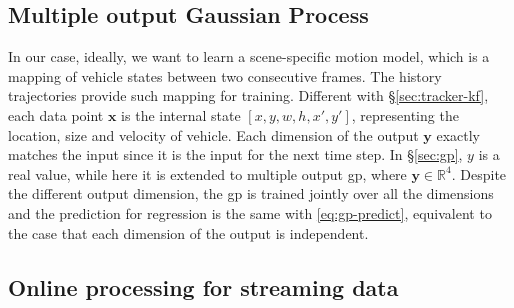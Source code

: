 \subsection{Multiple output Gaussian Process}

In our case, ideally, we want to learn a scene-specific motion model, which is a mapping of vehicle states between two consecutive frames. 
The history trajectories provide such mapping for training. 
Different with \S\ref{sec:tracker-kf}, each data point $\mathbf{x}$ is the internal state $[x, y, w, h, x', y']$, 
representing the location, size and velocity of vehicle. 
Each dimension of the output $\mathbf{y}$ exactly matches the input since it is the input for the next time step.
In \S\ref{sec:gp}, $y$ is a real value, while here it is extended to multiple output \gls{gp}, where $\mathbf{y} \in \mathbb{R}^{4}$. 
Despite the different output dimension, the \gls{gp} is trained jointly over all the dimensions and the prediction for regression is the same with \ref{eq:gp-predict}, equivalent to the case that each dimension of the output is independent.

\subsection{Online processing for streaming data}



